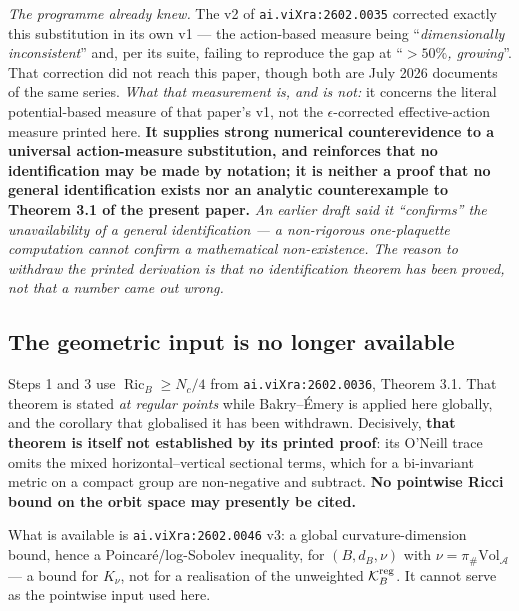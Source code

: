 \documentclass[11pt]{article}
\newcommand{\A}{\mathcal A}
\begin{document}
\emph{The programme already knew.} The v2 of \texttt{ai.viXra:2602.0035} corrected
exactly this substitution in its own v1 --- the action-based measure being
``\emph{dimensionally inconsistent}'' and, per its suite, failing to reproduce the gap
at ``\emph{$>50\%$, growing}''. That correction did not reach this paper, though both
are July 2026 documents of the same series. \emph{What that measurement is, and is
not:} it concerns the literal potential-based measure of that paper's v1, not the
$\epsilon$-corrected effective-action measure printed here. \textbf{It supplies strong numerical counterevidence to a
universal action-measure substitution, and reinforces that no identification
may be made by notation; it is neither a proof that no general identification
exists nor an analytic counterexample to Theorem 3.1 of the present paper.}
\emph{An earlier draft said it ``confirms'' the unavailability of a general
identification --- a non-rigorous one-plaquette computation cannot confirm a
mathematical non-existence. The reason to withdraw the printed derivation is
that no identification theorem has been proved, not that a number came out
wrong.}

\subsection{The geometric input is no longer available}

Steps 1 and 3 use $\operatorname{Ric}_B\ge N_c/4$ from
\texttt{ai.viXra:2602.0036}, Theorem 3.1. That theorem is stated \emph{at regular
points} while Bakry--\'Emery is applied here globally, and the corollary that
globalised it has been withdrawn. Decisively, \textbf{that theorem is itself not
established by its printed proof}: its O'Neill trace omits the mixed
horizontal--vertical sectional terms, which for a bi-invariant metric on a compact
group are non-negative and subtract. \textbf{No pointwise Ricci bound on the orbit
space may presently be cited.}

What is available is \texttt{ai.viXra:2602.0046} v3: a global curvature-dimension
bound, hence a Poincar\'e/log-Sobolev inequality, for $(B,d_B,\nu)$ with
$\nu=\pi_\#\mathrm{Vol}_{\A}$ --- a bound for $K_\nu$, not for a realisation of the
unweighted $\mathcal K_B^{\rm reg}$. It cannot serve as the pointwise input used here.
\end{document}
